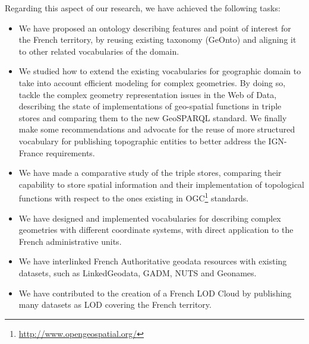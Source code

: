 Regarding this aspect of our research, we have achieved the following tasks:
 \begin{itemize}
  \item We have proposed an ontology describing features and point of interest for the French territory, by reusing existing taxonomy (GeOnto) and aligning it to other related vocabularies of the domain.
  \item  We studied how to extend the existing vocabularies for geographic domain to take into account efficient modeling for complex geometries. By doing so, tackle the complex geometry representation issues in the Web of Data, describing the state of implementations of geo-spatial functions in triple stores and comparing them to the new GeoSPARQL standard.  We finally make some recommendations and advocate for the reuse of more structured vocabulary for publishing topographic entities to better address the IGN-France requirements.
  
 \item We have made a comparative study of the triple stores, comparing their capability to store spatial information and their implementation of topological functions with respect to the ones 
existing in OGC\footnote{\url{http://www.opengeospatial.org/}} standards.
 \item  We have designed and implemented vocabularies for describing complex geometries with different coordinate systems, with direct application to the French administrative units.
 
 \item We have interlinked French Authoritative geodata resources with existing datasets, such as LinkedGeodata, GADM, NUTS and Geonames.
 
 \item We have contributed to the creation of a French LOD Cloud by publishing many datasets as LOD covering the French territory.
 

\end{itemize}

 

